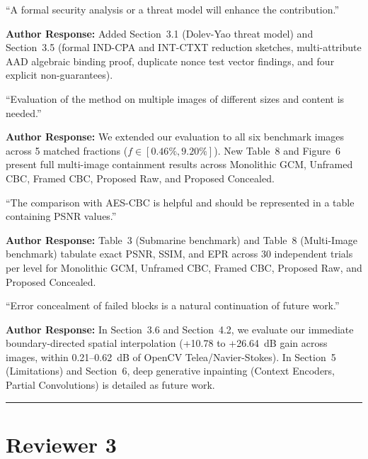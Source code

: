 \documentclass[11pt,a4paper]{article}
\begin{document}
\begin{tcolorbox}[title=Comment 2.3 (Formal Security Analysis and Threat Model)]
``A formal security analysis or a threat model will enhance the contribution.''
\end{tcolorbox}
\textbf{Author Response:} Added Section~3.1 (Dolev-Yao threat model) and Section~3.5 (formal IND-CPA and INT-CTXT reduction sketches, multi-attribute AAD algebraic binding proof, duplicate nonce test vector findings, and four explicit non-guarantees).

\begin{tcolorbox}[title=Comment 2.4 (Multi-Image Evaluation across Sizes and Content)]
``Evaluation of the method on multiple images of different sizes and content is needed.''
\end{tcolorbox}
\textbf{Author Response:} We extended our evaluation to all six benchmark images across 5 matched fractions ($f \in [0.46\%, 9.20\%]$). New Table~8 and Figure~6 present full multi-image containment results across Monolithic GCM, Unframed CBC, Framed CBC, Proposed Raw, and Proposed Concealed.

\begin{tcolorbox}[title=Comment 2.5 (Comparison with AES-CBC in PSNR Table)]
``The comparison with AES-CBC is helpful and should be represented in a table containing PSNR values.''
\end{tcolorbox}
\textbf{Author Response:} Table~3 (Submarine benchmark) and Table~8 (Multi-Image benchmark) tabulate exact PSNR, SSIM, and EPR across 30 independent trials per level for Monolithic GCM, Unframed CBC, Framed CBC, Proposed Raw, and Proposed Concealed.

\begin{tcolorbox}[title=Comment 2.6 (Error Concealment of Failed Blocks)]
``Error concealment of failed blocks is a natural continuation of future work.''
\end{tcolorbox}
\textbf{Author Response:} In Section~3.6 and Section~4.2, we evaluate our immediate boundary-directed spatial interpolation (+10.78 to +26.64~dB gain across images, within 0.21--0.62~dB of OpenCV Telea/Navier-Stokes). In Section~5 (Limitations) and Section~6, deep generative inpainting (Context Encoders, Partial Convolutions) is detailed as future work.

\vspace{1em}
\hrule
\vspace{1em}

\section*{Reviewer 3}
\end{document}
